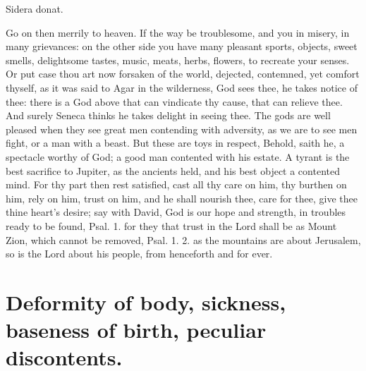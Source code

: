 {Sidera donat.

Go on then merrily to heaven. If the way be troublesome, and you in
misery, in many grievances: on the other side you have many pleasant
sports, objects, sweet smells, delightsome tastes, music, meats, herbs,
flowers, \etc{} to recreate your senses. Or put case thou art now forsaken
of the world, dejected, contemned, yet comfort thyself, as it was said
to Agar in the wilderness, God sees thee, he takes notice of
thee: there is a God above that can vindicate thy cause, that can
relieve thee. And surely Seneca thinks he takes delight in seeing
thee. The gods are well pleased when they see great men contending with
adversity, as we are to see men fight, or a man with a beast. But these
are toys in respect,  Behold, saith he, a spectacle worthy of
God; a good man contented with his estate. A tyrant is the best
sacrifice to Jupiter, as the ancients held, and his best object a
contented mind. For thy part then rest satisfied, cast all thy care on
him, thy burthen on him, rely on him, trust on him, and he shall
nourish thee, care for thee, give thee thine heart's desire; say with
David, God is our hope and strength, in troubles ready to be found,
Psal.  1. for they that trust in the Lord shall be as Mount Zion,
which cannot be removed, Psal.  1. 2. as the mountains are about
Jerusalem, so is the Lord about his people, from henceforth and for
ever.


\section{Deformity of body, sickness, baseness of birth, peculiar discontents.}

}
